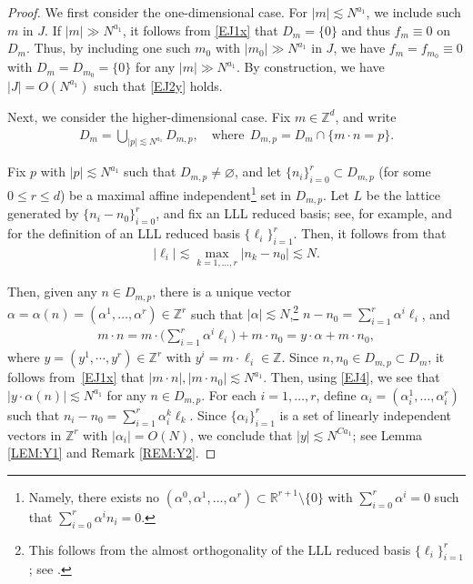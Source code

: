 \documentclass[%
11pt,  reqno]{amsart}
\newcommand{\1}{\hspace{0.2mm}\text{I}\hspace{0.2mm}}
\newcommand{\noi}{\noindent}
\newcommand{\Z}{\mathbb{Z}}
\newcommand{\R}{\mathbb{R}}
\newcommand{\al}{\alpha}
\renewcommand{\l}{\ell}
\newcommand{\les}{\lesssim}
\numberwithin{equation}{section}
\numberwithin{theorem}{section}
\begin{document}
\begin{proof}
We first consider  the one-dimensional case.
For $|m| \les N^{a_1}$, we include such $m$ in $J$.
If $|m| \gg N^{a_1}$, 
it follows from \eqref{EJ1x} that 
$D_m = \{0\}$ and thus $f_m \equiv 0$ on $D_m$.
Thus, by including one such $m_0$ with 
 $|m_0| \gg N^{a_1}$
in $J$, 
we have 
 $f_{m} = f_{m_0}\equiv 0$ 
with $D_{m} = D_{m_0} = \{0\}$ for any $|m|\gg N^{a_1}$.
By construction, we have 
 $|J| = O(N^{a_1})$ 
such that \eqref{EJ2y} holds.



Next, we consider the higher-dimensional case.
Fix $m \in \Z^d$, and write 
\begin{align}
 D_m = \bigcup_{|p| \les N^{a_1}} D_{m, p}, 
\quad \text{where}\ \  D_{m, p} = D_m \cap \{m\cdot n  = p \}.
\label{EJ2a}
\end{align}


\noi
Fix 
$p$ with $|p| \les N^{a_1}$
such that  $D_{m, p} \ne \varnothing$, 
and 
let $\{n_i\}_{i = 0}^r \subset D_{m, p}$
(for some $0 \le r \le d$) be a maximal affine independent\footnote{Namely, 
there exists no $(\al^0, \al^1, \dots, \al^r) \subset \R^{r+1}\setminus\{0\}$ with $\sum_{i = 0}^r \al^i = 0$
such that $\sum_{i = 0}^r \al^i n_i = 0$.} set in $D_{m, p}$.
Let $L$ be the lattice generated by 
$\{n_i - n_0\}_{i = 0}^r$, 
and fix an 
 LLL reduced basis; see, for example, 
 \cite{LLL} and \cite[Chapter 4]{Bre}
 for the definition of an LLL reduced basis
$\{\l_i\}_{i = 1}^r$.
Then, it follows from 
\cite[Theorem 4.8]{Bre}
that 
\begin{align*}
|\l_i| \les \max_{k = 1, \dots,  r}|n_k - n_0|\les N.
\end{align*}


\noi
Then, given any $n \in D_{m, p}$, there is a unique  vector 
$\al = \al(n) = (\al^1, \dots, \al^r) \in \Z^r$ 
such that $|\al| \les N$,\footnote{This follows
from the almost orthogonality of the LLL reduced basis $\{\l_i\}_{i = 1}^r$;
see \cite[p.\,56]{Bre}.}
$n - n_0 = \sum_{i=1}^r \al^i \l_i$, and 
\begin{align}
m \cdot n = m \cdot \bigg( \sum_{i=1}^r \al^i \l_i\bigg) + m \cdot n_0 
= y \cdot \al + m \cdot n_0,
\label{EJ4}
\end{align}
where $y = (y^1, \cdots, y^r) \in \Z^r$ with 
$y^i = m \cdot \l_i \in \Z$.
Since 
$n, n_0 \in D_{m, p} \subset D_m$, 
it follows from~\eqref{EJ1x}
that 
 $|m \cdot n|, |m \cdot n_0| \les N^{a_1}$.
Then, using \eqref{EJ4}, we see that 
 $|y \cdot \al(n)| \les N^{a_1}$
 for any $n \in D_{m, p}$.
For each $i = 1, \dots, r$, 
define $\al_i = (\al_i^1, \dots, \al_i^r)$
such that 
 $n_i - n_0 = \sum_{i=1}^r \al^k_i \l_k$.
Since
$\{\al_i\}_{i = 1}^r$ is a set of  linearly independent  vectors 
in $\Z^r$ 
with $|\al_i| = O(N)$, 
we conclude that $|y| \les N^{Ca_1}$; see Lemma \ref{LEM:Y1}
and Remark \ref{REM:Y2}.




\end{proof}
\end{document}
